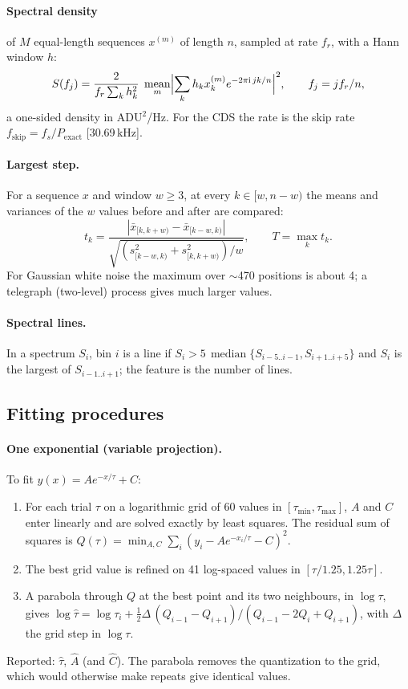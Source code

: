 \documentclass[10pt]{article}
\newcommand{\med}{\operatorname*{median}}
\newcommand{\mean}{\operatorname*{mean}}
\begin{document}
\paragraph{Spectral density} of $M$ equal-length sequences $x^{(m)}$ of length $n$, sampled at rate $f_r$, with a Hann window $h$:
\begin{equation}
S(f_j) = \frac{2}{f_r\sum_k h_k^2}\;\mean_m \Bigl|\sum_k h_k x^{(m)}_k e^{-2\pi \mathrm{i}\, jk/n}\Bigr|^2,\qquad f_j = j f_r/n,
\end{equation}
a one-sided density in ADU$^2$/Hz. For the CDS the rate is the skip rate $f_\text{skip} = f_s/P_\text{exact}$ [30.69\,kHz].

\paragraph{Largest step.} For a sequence $x$ and window $w \ge 3$, at every $k \in [w, n - w)$ the means and variances of the $w$ values
before and after are compared:
\begin{equation}
t_k = \frac{|\bar x_{[k,k+w)} - \bar x_{[k-w,k)}|}{\sqrt{(s^2_{[k-w,k)} + s^2_{[k,k+w)})/w}},\qquad T = \max_k t_k .
\end{equation}
For Gaussian white noise the maximum over $\sim$470 positions is about 4; a telegraph (two-level) process gives much larger values.

\paragraph{Spectral lines.} In a spectrum $S_i$, bin $i$ is a line if $S_i > 5\,\med\{S_{i-5..i-1}, S_{i+1..i+5}\}$ and $S_i$ is the
largest of $S_{i-1..i+1}$; the feature is the number of lines.

\subsection{Fitting procedures}
\paragraph{One exponential (variable projection).} To fit $y(x) = A e^{-x/\tau} + C$:
\begin{enumerate}
\item For each trial $\tau$ on a logarithmic grid of 60 values in $[\tau_\text{min}, \tau_\text{max}]$, $A$ and $C$ enter linearly and
  are solved exactly by least squares. The residual sum of squares is $Q(\tau) = \min_{A,C}\sum_i (y_i - Ae^{-x_i/\tau} - C)^2$.
\item The best grid value is refined on 41 log-spaced values in $[\tau/1.25, 1.25\tau]$.
\item A parabola through $Q$ at the best point and its two neighbours, in $\log\tau$, gives
  $\log\hat\tau = \log\tau_i + \tfrac12\Delta\,(Q_{i-1} - Q_{i+1})/(Q_{i-1} - 2Q_i + Q_{i+1})$, with $\Delta$ the grid step in $\log\tau$.
\end{enumerate}
Reported: $\hat\tau$, $\hat A$ (and $\hat C$). The parabola removes the quantization to the grid, which would otherwise make repeats
give identical values.
\end{document}
